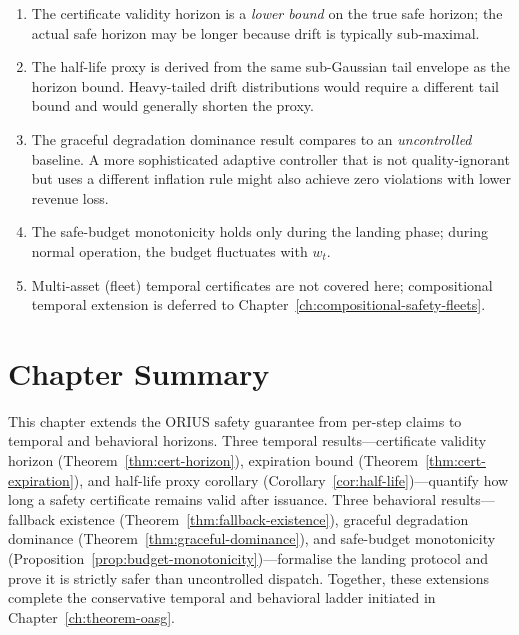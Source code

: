 \begin{enumerate}
  \item The certificate validity horizon is a \emph{lower bound} on
    the true safe horizon; the actual safe horizon may be longer
    because drift is typically sub-maximal.
  \item The half-life proxy is derived from the same sub-Gaussian tail
    envelope as the horizon bound.  Heavy-tailed drift distributions
    would require a different tail bound and would generally shorten the
    proxy.
  \item The graceful degradation dominance result compares to an
    \emph{uncontrolled} baseline.  A more sophisticated adaptive
    controller that is not quality-ignorant but uses a different
    inflation rule might also achieve zero violations with lower
    revenue loss.
  \item The safe-budget monotonicity holds only during the landing
    phase; during normal operation, the budget fluctuates with $w_t$.
  \item Multi-asset (fleet) temporal certificates are not covered here;
    compositional temporal extension is deferred to
    Chapter~\ref{ch:compositional-safety-fleets}.
\end{enumerate}

\section{Chapter Summary}

This chapter extends the ORIUS safety guarantee from per-step claims
to temporal and behavioral horizons.  Three temporal results---certificate
  validity horizon (Theorem~\ref{thm:cert-horizon}), expiration bound
  (Theorem~\ref{thm:cert-expiration}), and half-life proxy corollary
  (Corollary~\ref{cor:half-life})---quantify how long a safety certificate
  remains valid after issuance.  Three behavioral results---fallback
existence (Theorem~\ref{thm:fallback-existence}), graceful degradation
dominance (Theorem~\ref{thm:graceful-dominance}), and safe-budget
monotonicity (Proposition~\ref{prop:budget-monotonicity})---formalise
the landing protocol and prove it is strictly safer than uncontrolled
  dispatch.  Together, these extensions complete the conservative temporal
  and behavioral ladder initiated in Chapter~\ref{ch:theorem-oasg}.

\begingroup
\def\domainblockid{t5t8}
\def\domainblocktitle{T5--T8}
\endgroup
